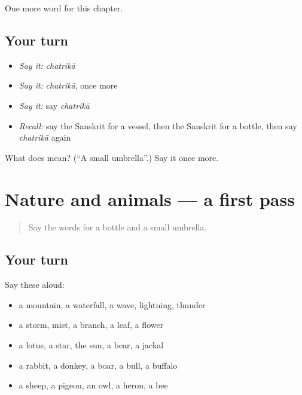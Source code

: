 \begin{grammarlens}[title={What you've built}]
One more word for this chapter.
\end{grammarlens}

\subsection*{Your turn}
\begin{itemize}
\raggedright
  \item \emph{Say it:} \emph{chatrikā}
  \item \emph{Say it:} \emph{chatrikā}, once more
  \item \emph{Say it:} say \emph{chatrikā}
  \item \emph{Recall:} say the Sanskrit for a vessel, then the Sanskrit for a bottle, then say \emph{chatrikā} again
\end{itemize}

\begin{tcolorbox}[breakable,colback=teal!4,colframe=teal!35!black,title={Before you move on}]
What does  mean? (\textquotedblleft{}A small umbrella\textquotedblright{}.) Say it once more.
\end{tcolorbox}
\section[(dialogue)]{Nature and animals — a first pass}

\label{lesson:SA-R119-first-pass-nature-and-animals}



\begin{quote}
Say the words for a bottle and a small umbrella.
\end{quote}

\subsection*{Your turn}
Say these aloud:

\begin{itemize}
\raggedright
  \item a mountain, a waterfall, a wave, lightning, thunder
  \item a storm, mist, a branch, a leaf, a flower
  \item a lotus, a star, the sun, a bear, a jackal
  \item a rabbit, a donkey, a boar, a bull, a buffalo
  \item a sheep, a pigeon, an owl, a heron, a bee
\end{itemize}

